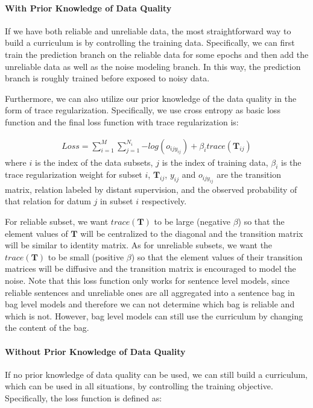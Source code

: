 \paragraph{With Prior Knowledge of Data Quality}
If we have both reliable and unreliable data, the most straightforward way to build a curriculum is by controlling the training data. Specifically, we can first train the prediction branch on the reliable data for some epochs and then add the unreliable data as well as the noise modeling branch. In this way, the prediction branch is roughly trained before exposed to noisy data.

Furthermore, we can also utilize our prior knowledge of the data quality in the form of trace regularization. Specifically, we use cross entropy as basic loss function and the final loss function with trace regularization is:

\begin{equation}
\begin{aligned}
Loss=\sum_{i=1}^M{\sum_{j=1}^{N_i}{-log(o_{ijy_{ij}})}} + \beta_i trace(\mathbf{T}_{ij})
\end{aligned}
\end{equation}
where $i$ is the index of the data subsets, $j$ is the index of training data, $\beta_i$ is the trace regularization weight for subset $i$, $\mathbf{T}_{ij}$, $y_{ij}$ and $o_{ijy_{ij}}$ are the transition matrix, relation labeled by distant supervision, and the observed probability of that relation for datum $j$ in subset $i$ respectively.

For reliable subset, we want $trace(\mathbf{T})$ to be large (negative $\beta$) so that the element values of $\mathbf{T}$ will be centralized to the diagonal and the transition matrix will be similar to identity matrix. As for unreliable subsets, we want the $trace(\mathbf{T})$ to be small (positive $\beta$) so that the element values of their transition matrices will be diffusive and the transition matrix is encouraged to model the noise. Note that this loss function only works for sentence level models, since reliable sentences and unreliable ones are all aggregated into a sentence bag in bag level models and therefore we can not determine which bag is reliable and which is not. However, bag level models can still use the curriculum by changing the content of the bag.

\paragraph{Without Prior Knowledge of Data Quality}
\label{curr_over_data}
If no prior knowledge of data quality can be used, we can still build a curriculum, which can be used in all situations, by controlling the training objective. Specifically, the loss function is defined as:

